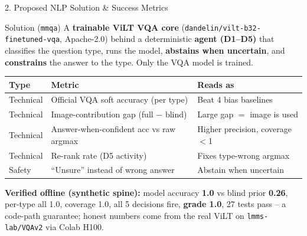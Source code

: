 \documentclass[10pt,aspectratio=169]{beamer}
\begin{document}
\begin{frame}{2. Proposed NLP Solution \& Success Metrics}
\begin{block}{Solution (\texttt{mmqa})}
A \textbf{trainable ViLT VQA core} (\texttt{dandelin/vilt-b32-finetuned-vqa}, Apache-2.0) behind a deterministic \textbf{agent (D1--D5)} that classifies the question type, runs the model, \textbf{abstains when uncertain}, and \textbf{constrains} the answer to the type. Only the VQA model is trained.
\end{block}

\begin{table}[h]
\centering\small
\begin{tabular}{lll}
\toprule
\textbf{Type} & \textbf{Metric} & \textbf{Reads as} \\
\midrule
Technical & Official VQA soft accuracy (per type) & Beat 4 bias baselines \\
Technical & Image-contribution gap (full $-$ blind) & Large gap $=$ image is used \\
Technical & Answer-when-confident acc vs raw argmax & Higher precision, coverage $<$1 \\
Technical & Re-rank rate (D5 activity) & Fixes type-wrong argmax \\
Safety & ``Unsure'' instead of wrong answer & Abstain when uncertain \\
\bottomrule
\end{tabular}
\end{table}

\textbf{Verified offline (synthetic spine):} model accuracy \textbf{1.0} vs blind prior \textbf{0.26}, per-type all 1.0, coverage 1.0, all 5 decisions fire, \textbf{grade 1.0}, 27 tests pass -- a code-path guarantee; honest numbers come from the real ViLT on \texttt{lmms-lab/VQAv2} via Colab H100.
\end{frame}
\end{document}
